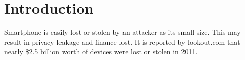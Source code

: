 \section{Introduction}
Smartphone is easily lost or stolen by an attacker as its small size. This may result in privacy leakage and finance lost. It is reported by lookout.com that nearly \$2.5 billion worth of devices were lost or stolen in 2011\cite{lookout-survey}.